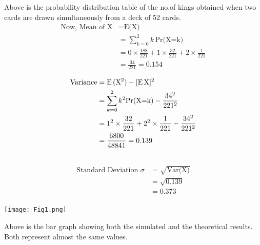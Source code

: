 \documentclass[journal,12pt,twocolumn]{IEEEtran}
\begin{document}
Above is the probability distribution table of the no.of kings obtained when two cards are drawn simultaneously from a deck of 52 cards.
\begin{align}
\nonumber\text{Now, Mean of X}&= \text{E(X)} \\ \nonumber
               &=\sum_{k=0}^{2} \nonumber k\,\text{Pr(X=k)}\\\nonumber
               &= 0\times\frac{188}{221} + 1 \times\frac{32}{221} + 2 \times\frac{1}{221}\\
               &= \frac{34}{221} = 0.154\\\nonumber
\end{align}
\vspace*{-1.5cm}
\begin{align}
 \nonumber \text{Variance} &=\text{E}\,(\text{X}^2) - [\text{E}\,\text{X}]^2\\\nonumber
                  &= \sum_{k=0}^{2} k^2\text{Pr(X=k)} - \frac{34^2}{221^2}\\\nonumber
                  &= 1^2\times\frac{32}{221} + 2^2\times\frac{1}{221} - \frac{34^2}{221^2}\\\vspace{0.1cm}
                  &= \frac{6800}{48841} = 0.139\\\nonumber
\end{align}
\vspace*{-1.5cm}
\begin{align}
\nonumber\text{Standard Deviation }\sigma &= \sqrt{\text{Var(X)}}\\ \nonumber
&= \sqrt{0.139}\\ &= 0.373\\\nonumber
\end{align}

\newpage

\texttt{[image: Fig1.png]}

 Above is the bar graph showing both the simulated and the theoretical results. Both represent almost the same values. 
\end{document}
